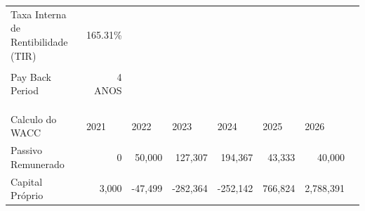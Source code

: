 \documentclass[11pt]{article}
\begin{document}
\begin{adjustbox}{center}
\begin{tabular}{lrrrrrrr}
			\multicolumn{1}{|l|}{Taxa Interna de Rentibilidade (TIR)}           & \multicolumn{1}{r|}{165.31\%}  &                                &                               &                                &                              &                                &                                \\ \cline{1-2}
			&                                &                                &                               &                                &                              &                                &                                \\ \cline{1-2}
			\multicolumn{1}{|l|}{Pay Back Period}                         & \multicolumn{1}{r|}{4 ANOS}    &                                &                               &                                &                              &                                &                                \\ \cline{1-2}
			&                                &                                &                               &                                &                              &                                &                                \\
			&                                &                                &                               &                                &                              &                                &                                \\
			&                                &                                &                               &                                &                              &                                &                                \\ \cline{1-7}
			\multicolumn{1}{|l|}{Calculo do WACC}                         & \multicolumn{1}{l|}{2021}      & \multicolumn{1}{l|}{2022}      & \multicolumn{1}{l|}{2023}     & \multicolumn{1}{l|}{2024}      & \multicolumn{1}{l|}{2025}    & \multicolumn{1}{l|}{2026}      & \multicolumn{1}{l}{}           \\ \cline{1-7}
			\multicolumn{1}{|l|}{Passivo Remunerado}                      & \multicolumn{1}{r|}{0}         & \multicolumn{1}{r|}{50,000}     & \multicolumn{1}{r|}{127,307}   & \multicolumn{1}{r|}{194,367}    & \multicolumn{1}{r|}{43,333}   & \multicolumn{1}{r|}{40,000}     &                                \\ \cline{1-7}
			\multicolumn{1}{|l|}{Capital Próprio}                         & \multicolumn{1}{r|}{3,000}     & \multicolumn{1}{r|}{-47,499}    & \multicolumn{1}{r|}{-282,364}  & \multicolumn{1}{r|}{-252,142}   & \multicolumn{1}{r|}{766,824}  & \multicolumn{1}{r|}{2,788,391}   &                                \\ \cline{1-7}

\end{tabular}
\end{adjustbox}
\end{document}
